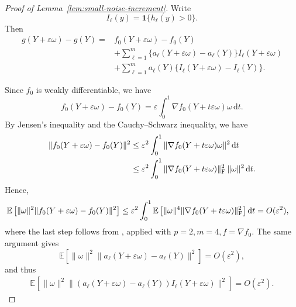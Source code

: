 \documentclass[12pt]{article}
\newcommand{\rd}{{\mathrm{d}}}
\newcommand{\EE}[2][]{\mathbb{E}_{#1}\left[#2\right]}
\newcommand{\ep}{\varepsilon}
\theoremstyle{general}
\begin{document}
\begin{proof}[Proof of Lemma~\ref{lem:small-noise-increment}]
Write
\[
I_\ell(y)=\mathbf 1\{h_\ell(y)>0\}.
\]
Then
\begin{align*}
g(Y+\ep\omega)-g(Y)
={}&
f_0(Y+\ep\omega)-f_0(Y)\\
&+
\sum_{\ell=1}^m
\{a_\ell(Y+\ep\omega)-a_\ell(Y)\}
I_\ell(Y+\ep\omega)\\
&+
\sum_{\ell=1}^m
a_\ell(Y)
\{I_\ell(Y+\ep\omega)-I_\ell(Y)\}.
\end{align*}

Since $f_0$ is weakly differentiable, we have
\[
f_0(Y+\ep\omega)-f_0(Y)
=
\ep
\int_0^1
\nabla f_0(Y+t\ep\omega)\omega\,\rd t.
\]
By Jensen's inequality and the Cauchy--Schwarz inequality, we have
\begin{align*}
    \|f_0(Y+\ep\omega)-f_0(Y)\|^2 &\leq \ep^2 \int_0^1 \|\nabla f_0(Y+t\ep\omega)\omega\|^2\,\rd t \\
    &\leq \ep^2 \int_0^1 \|\nabla f_0(Y+t\ep\omega)\|_{\rm F}^2\, \|\omega\|^2\,\rd t.
\end{align*}
Hence,
\begin{align*}
\mathbb E\left[
\|\omega\|^2
\|f_0(Y+\ep\omega)-f_0(Y)\|^2
\right] 
&\leq
\ep^2
\int_0^1
\mathbb E\left[
\|\omega\|^4
\|\nabla f_0(Y+t\ep\omega)\|_{\rm F}^2
\right]\rd t
=
O(\ep^2),
\end{align*}
where the last step follows from ,  applied with $p=2,m=4,f=\nabla f_0$. The same argument gives
\[
\mathbb E\left[
\|\omega\|^2
\|a_\ell(Y+\ep\omega)-a_\ell(Y)\|^2
\right]
=
O(\ep^2),
\]
and thus
\begin{align*}
    \EE{\|\omega\|^2 \|(a_\ell(Y+\ep\omega)-a_\ell(Y)) I_\ell(Y+\ep\omega)\|^2} = O(\ep^2).
\end{align*}


\end{proof}
\end{document}
